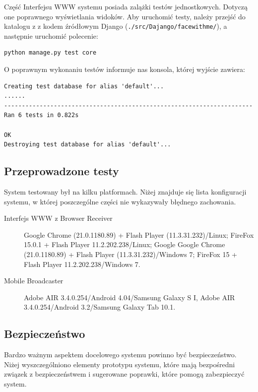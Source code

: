 Część Interfejsu WWW systemu posiada zalążki testów jednostkowych. Dotyczą one poprawnego wyświetlania widoków. Aby uruchomić testy, należy przejść do katalogu z z kodem źródłowym Django (\texttt{./src/Dajango/facewithme/}), a następnie uruchomić polecenie:

\lstset{language=Bash}
\begin{lstlisting}
python manage.py test core
\end{lstlisting}

O poprawnym wykonaniu testów informuje nas konsola, której wyjście zawiera:
\begin{lstlisting}
Creating test database for alias 'default'...
......
----------------------------------------------------------------------
Ran 6 tests in 0.822s

OK
Destroying test database for alias 'default'...
\end{lstlisting}

\subsection{Przeprowadzone testy}
\label{sec:EtapIprzeprowadzoneTesty}
System testowany był na kilku platformach. Niżej znajduje się lista konfiguracji systemu, w której poszczególne części nie wykazywały błędnego zachowania.

\begin{description}
    \item[Interfejs WWW z Browser Receiver] Google Chrome (21.0.1180.89) + Flash Player (11.3.31.232)/Linux; FireFox 15.0.1 + Flash Player 11.2.202.238/Linux; Google Google Chrome (21.0.1180.89) + Flash Player (11.3.31.232)/Windows 7;  FireFox 15 + Flash Player 11.2.202.238/Windows 7.
    \item[Mobile Broadcaster] Adobe AIR 3.4.0.254/Android 4.04/Samsung Galaxy S I, Adobe AIR 3.4.0.254/Android 3.2/Samsung Galaxy Tab 10.1.
\end{description}

\subsection{Bezpieczeństwo}

Bardzo ważnym aspektem docelowego systemu powinno być bezpieczeństwo. Niżej wyszczególniono elementy prototypu systemu, które mają bezpośredni związek z bezpieczeństwem i sugerowane poprawki, które pomogą zabezpieczyć system.

